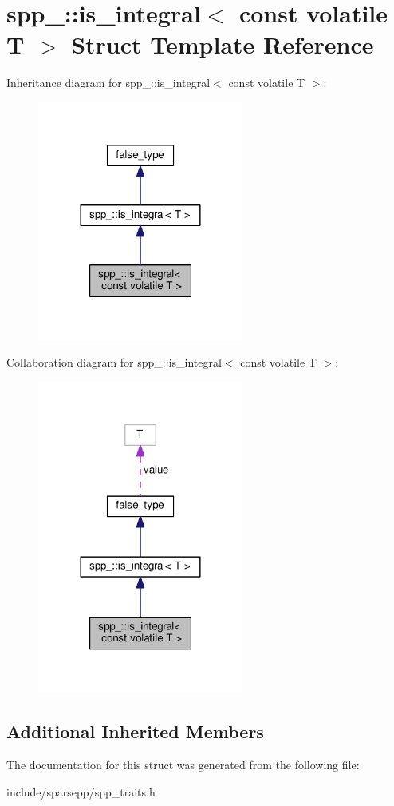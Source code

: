 \hypertarget{structspp___1_1is__integral_3_01const_01volatile_01_t_01_4}{}\section{spp\+\_\+\+:\+:is\+\_\+integral$<$ const volatile T $>$ Struct Template Reference}
\label{structspp___1_1is__integral_3_01const_01volatile_01_t_01_4}


Inheritance diagram for spp\+\_\+\+:\+:is\+\_\+integral$<$ const volatile T $>$\+:\nopagebreak
\begin{figure}[H]
\begin{center}
\leavevmode
\includegraphics[width=192pt]{structspp___1_1is__integral_3_01const_01volatile_01_t_01_4__inherit__graph}
\end{center}
\end{figure}


Collaboration diagram for spp\+\_\+\+:\+:is\+\_\+integral$<$ const volatile T $>$\+:\nopagebreak
\begin{figure}[H]
\begin{center}
\leavevmode
\includegraphics[width=192pt]{structspp___1_1is__integral_3_01const_01volatile_01_t_01_4__coll__graph}
\end{center}
\end{figure}
\subsection*{Additional Inherited Members}


The documentation for this struct was generated from the following file\+:\begin{DoxyCompactItemize}
\item 
include/sparsepp/spp\+\_\+traits.\+h\end{DoxyCompactItemize}
